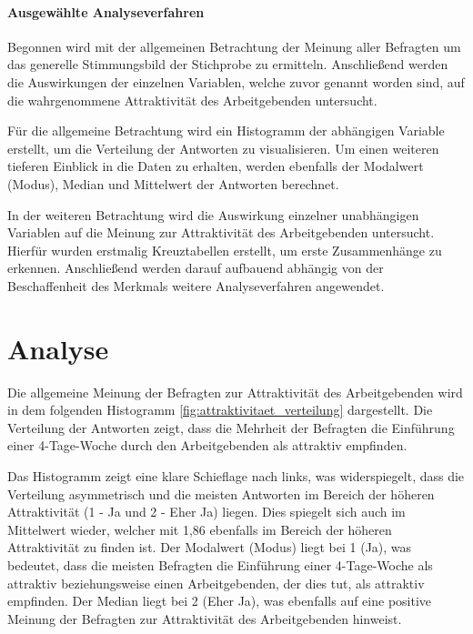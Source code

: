 \paragraph{Ausgewählte Analyseverfahren} Begonnen wird mit der allgemeinen Betrachtung der Meinung 
aller Befragten um das generelle Stimmungsbild der Stichprobe zu ermitteln. Anschließend werden die Auswirkungen
der einzelnen Variablen, welche zuvor genannt worden sind, auf die wahrgenommene Attraktivität des Arbeitgebenden 
untersucht.

Für die allgemeine Betrachtung wird ein Histogramm der abhängigen Variable erstellt, um die Verteilung 
der Antworten zu visualisieren. Um einen weiteren tieferen Einblick in die Daten zu erhalten, werden 
ebenfalls der Modalwert (Modus), Median und Mittelwert der Antworten berechnet.

In der weiteren Betrachtung wird die Auswirkung einzelner unabhängigen Variablen auf die Meinung zur 
Attraktivität des Arbeitgebenden untersucht. Hierfür wurden erstmalig Kreuztabellen erstellt, um erste
Zusammenhänge zu erkennen. 
Anschließend werden darauf aufbauend abhängig von der Beschaffenheit des Merkmals
weitere Analyseverfahren angewendet. %

\section{Analyse}

Die allgemeine Meinung der Befragten zur Attraktivität des Arbeitgebenden wird in dem folgenden Histogramm 
\ref{fig:attraktivitaet_verteilung} dargestellt. Die Verteilung der Antworten zeigt, dass die Mehrheit der
Befragten die Einführung einer 4-Tage-Woche durch den Arbeitgebenden als attraktiv empfinden.

Das Histogramm zeigt eine klare Schieflage nach links, was widerspiegelt, dass die Verteilung 
asymmetrisch und die meisten Antworten im Bereich der höheren Attraktivität (1 - Ja und 2 - Eher Ja) liegen. 
Dies spiegelt sich auch im Mittelwert wieder, welcher mit 1,86 ebenfalls im Bereich der höheren Attraktivität
zu finden ist. Der Modalwert (Modus) liegt bei 1 (Ja), was bedeutet, dass die meisten Befragten die Einführung einer 
4-Tage-Woche als attraktiv beziehungsweise einen Arbeitgebenden, der dies tut, als attraktiv empfinden. Der Median
liegt bei 2 (Eher Ja), was ebenfalls auf eine positive Meinung der Befragten zur Attraktivität des Arbeitgebenden
hinweist.


